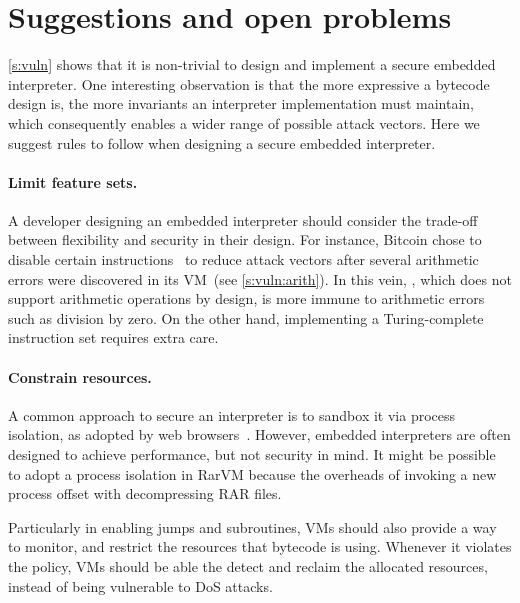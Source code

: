 \section{Suggestions and open problems}
\label{s:chal}

\autoref{s:vuln} shows that it is non-trivial to design and implement
a secure embedded interpreter.  One interesting observation is that the more
expressive a bytecode design is, the more invariants an interpreter
implementation must maintain, which consequently enables a wider range of
possible attack vectors.  Here we suggest rules to follow when designing
a secure embedded interpreter.

\paragraph{Limit feature sets.} 
A developer designing an embedded interpreter should consider the trade-off between
flexibility and security in their design. For instance, Bitcoin chose to disable
certain instructions~\cite{bitcoin:script} to reduce attack vectors after
several arithmetic errors were discovered in its VM~(see
\autoref{s:vuln:arith}). In this vein, \inetdiag, which does not support
arithmetic operations by design, is more immune to arithmetic errors such as
division by zero. On the other hand, implementing a Turing-complete instruction
set requires extra care.

\paragraph{Constrain resources.}
A common approach to secure an interpreter is to sandbox it via process
isolation, as adopted by web browsers~\cite{reis:chrome}. However, embedded interpreters
are often designed to achieve performance, but not security in mind. It might be
possible to adopt a process isolation in RarVM because the overheads of invoking a
new process offset with decompressing RAR files.

Particularly in enabling jumps and subroutines, VMs should also provide a way to
monitor, and restrict the resources that bytecode is using. Whenever it violates 
the policy, VMs should be able the detect and reclaim the allocated resources,
instead of being vulnerable to DoS attacks.



